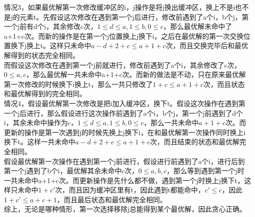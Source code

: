 \documentclass{article}
\begin{document}
\begin{CJK}{UTF8}{gkai}
情况3，如果最优解第一次修改缓冲区的i，j操作是将j换出缓冲区，换上不是i也不是j的元素t。先假设这次修改在遇到第一个j后进行，修改前遇到了a个i，b个j，第一个j前有d个i，其余修改c次，$1\leq d\leq a, 1\leq b, 0 \leq c$，那么最优解未命中了a+1+c次。而新的操作是在第一个j位置换上j换下i，之后在最优解的第一次交换位置换下j换上t。这样只未命中$a-d+2+c\leq a+1+c$次，而且交换完毕后和最优解得到的状态完全相同。\\
而假设这次修改在遇到第一个j前就进行，修改前遇到了a个i，其余修改了c次，$0\leq a,c$，那么最优解一共未命中a+1+c次。而新的做法是不动，只在原来最优解第一次修改的时候换下i换上t，那么一共只修改了$1+c\leq a+1+c$次，而且状态和最优解得到的完全相同。\\
情况4，假设最优解第一次修改是把i加入缓冲区，换下t。假设这次操作在遇到第一个j后进行，那么假设进行这次操作前遇到了a个i，b个j，第一个j前遇到了d个i，其余未命中操作为c，$1\leq d\leq a,1\leq b,0\leq c$，那么一共未命中$a+1+c$次。而更新的操作是第一次遇到j的时候先换上j换下i，在和最优解第一次操作同时换上i换下t。这样一共未命中$a-d+2+c\leq a+1+c$次，而且结束的状态和最优解完全相同。\\
假设最优解第一次操作在遇到第一个j前进行，假设进行前遇到了a个i，进行后到第一个j遇到了b个i，最优解其余未命中c次，$0\leq a,b,c$，那么等到遇到第一个j时一共未命中a+1+c次。而更新操作是先什么都不做，遇到第一个j时换上j换下t，这样只未命中$1+c'$次，而且因为缓冲区里有t，因此遇到t都能命中，$c'\leq c$，因此$1+c'\leq a+c+1$，而且最后状态和最优解完全相同。\\
综上，无论是哪种情形，第一次选择移除j总能得到某个最优解，因此贪心正确。

\end{CJK}
\end{document}
